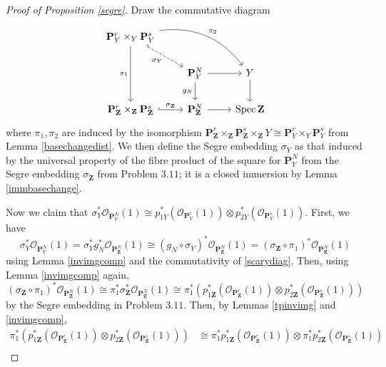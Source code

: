 \documentclass[12pt,letterpaper]{article}
\theoremstyle{definition}
\theoremstyle{remark}
\numberwithin{equation}{section}
\numberwithin{figure}{problem}
\DeclareMathOperator{\Spec}{Spec}
\newcommand{\OO}{\mathcal{O}}
\begin{document}
\begin{proof}[Proof of Proposition \ref{segre}]
  Draw the commutative diagram
  \begin{equation}\label{scarydiag}
    \begin{tikzcd}
      \mathbf{P}_Y^r \times_Y \mathbf{P}_Y^s\arrow{dd}[swap]{\pi_1}\arrow[dashed,hook]{dr}[swap]{\sigma_Y}\arrow[bend left,crossing over]{drr}{\pi_2}\\
      & \mathbf{P}_Y^N\dar[swap]{g_N} \rar & Y\dar\\
      \mathbf{P}_{\mathbf{Z}}^r \times_{\mathbf{Z}} \mathbf{P}_{\mathbf{Z}}^s \rar[hook]{\sigma_{\mathbf{Z}}} & \mathbf{P}_{\mathbf{Z}}^N \rar & \Spec \mathbf{Z}
    \end{tikzcd}
  \end{equation}
  where $\pi_1,\pi_2$ are induced by the isomorphism $\mathbf{P}^r_{\mathbf{Z}} \times_{\mathbf{Z}} \mathbf{P}^s_{\mathbf{Z}} \times_{\mathbf{Z}} Y \cong \mathbf{P}^r_Y \times_Y \mathbf{P}^s_Y$ from Lemma \ref{basechangedist}. We then define the Segre embedding $\sigma_Y$ as that induced by the universal property of the fibre product of the square for $\mathbf{P}_Y^N$ from the Segre embedding $\sigma_{\mathbf{Z}}$ from Problem $3.11$; it is a closed immersion by Lemma \ref{immbasechange}.
  \par Now we claim that $\sigma_Y^*\OO_{\mathbf{P}_Y^N}(1) \cong p_{1Y}^*(\OO_{\mathbf{P}_Y^r}(1)) \otimes p_{2Y}^*(\OO_{\mathbf{P}_Y^s}(1))$. First, we have
  \begin{equation*}
    \sigma_Y^*\OO_{\mathbf{P}_Y^N}(1) = \sigma_Y^*g_N^*\OO_{\mathbf{P}_{\mathbf{Z}}^N}(1) \cong (g_N \circ \sigma_Y)^*\OO_{\mathbf{P}_{\mathbf{Z}}^N}(1) = (\sigma_{\mathbf{Z}} \circ \pi_1)^*\OO_{\mathbf{P}_{\mathbf{Z}}^N}(1)
  \end{equation*}
  using Lemma \ref{invimgcomp} and the commutativity of \eqref{scarydiag}. Then, using Lemma \ref{invimgcomp} again,
  \begin{equation*}
    (\sigma_{\mathbf{Z}} \circ \pi_1)^*\OO_{\mathbf{P}_{\mathbf{Z}}^N}(1) \cong \pi_1^*\sigma_{\mathbf{Z}}^*\OO_{\mathbf{P}_{\mathbf{Z}}^N}(1) \cong \pi_1^*(p_{1\mathbf{Z}}^*(\OO_{\mathbf{P}_\mathbf{Z}^r}(1)) \otimes p_{2\mathbf{Z}}^*(\OO_{\mathbf{P}_\mathbf{Z}^s}(1)))
  \end{equation*}
  by the Segre embedding in Problem $3.11$. Then, by Lemmas \ref{tpinvimg} and \ref{invimgcomp},
  \begin{align*}
    \pi_1^*(p_{1\mathbf{Z}}^*(\OO_{\mathbf{P}_\mathbf{Z}^r}(1)) \otimes p_{2\mathbf{Z}}^*(\OO_{\mathbf{P}_\mathbf{Z}^s}(1))) &\cong \pi_1^*p_{1\mathbf{Z}}^*(\OO_{\mathbf{P}_\mathbf{Z}^r}(1)) \otimes \pi_1^*p_{2\mathbf{Z}}^*(\OO_{\mathbf{P}_\mathbf{Z}^s}(1))\\

\end{align*}
\end{proof}
\end{document}
